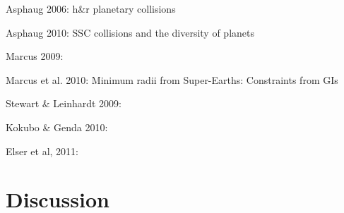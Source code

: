 \cite{Asphaug:2006p3729}
Asphaug 2006: h\&r planetary collisions

\cite{Asphaug:2010p3539}
Asphaug 2010: SSC collisions and the diversity of planets


\cite{2009ApJ...700L.118M}
Marcus 2009:

\cite{2010ApJ...712L..73M}
Marcus et al. 2010: Minimum radii from Super-Earths: Constraints from GIs

\cite{Stewart:2009p3265}
Stewart \& Leinhardt 2009:

\cite{2010ApJ...714L..21K}
Kokubo \& Genda 2010:

\cite{2011arXiv1105.4616E}
Elser et al, 2011:

\section{Discussion}






